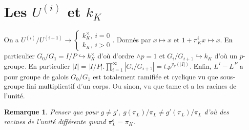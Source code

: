 \documentclass[a4paper,12pt]{book}
\theoremstyle{plain}
\newtheorem{rem}{Remarque}
\theoremstyle{definition}
\theoremstyle{remark}
\begin{document}
\section{Les $U^{(i)}$ et $k_K$}
On a $U^{(i)}/U^{(i+1)}\to
\begin{cases}k_K^\times,~i=0\\ k_K,~i>0\end{cases}$. Donnés par
$x\mapsto x$ et $1+\pi_K^ix\mapsto x$. En particulier
$G_0/G_1=I/P\hookrightarrow k_K^\times$ d'où d'ordre $\wedge p=1$
et $G_i/G_{i+1}\hookrightarrow k_K$ d'où un $p$-groupe. En 
particulier 
$|I|=|I/P|.\prod_{i=1}^\infty |G_i/G_{i+1}|=t.p^{v_p(|I|)}$.
Enfin, $L^I-L^P$ a pour groupe de galois $G_0/G_1$ est totalement
ramifiée et cyclique vu que sous-groupe fini multiplicatif d'un
corps. Ou sinon, vu que tame et a les racines de l'unité. 
\begin{rem}
    Penser que pour $g\ne g'$, $g(\pi_L)/\pi_L\ne g'(\pi_L)/\pi_L$
    d'où des racines de l'unité différente quand
    $\pi_L^e=\pi_K$.
\end{rem}
\end{document}

